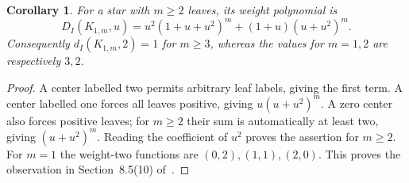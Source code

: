 \documentclass[11pt]{article}
\newtheorem{corollary}[theorem]{Corollary}
\newcommand{\di}{d_I}
\begin{document}
\begin{corollary}\label{cor:star}
For a star with $m\geq2$ leaves, its weight polynomial is
\[
 D_I(K_{1,m},u)=u^2(1+u+u^2)^m+(1+u)(u+u^2)^m.
\]
Consequently $\di(K_{1,m},2)=1$ for $m\geq3$, whereas the values
for $m=1,2$ are respectively $3,2$.
\end{corollary}
\begin{proof}
A center labelled two permits arbitrary leaf labels, giving the first
term. A center labelled one forces all leaves positive, giving
$u(u+u^2)^m$. A zero center also forces positive leaves; for $m\geq2$
their sum is automatically at least two, giving $(u+u^2)^m$.
Reading the coefficient of $u^2$ proves the assertion for $m\geq2$.
For $m=1$ the weight-two functions are $(0,2),(1,1),(2,0)$.
This proves the observation in Section~8.5(10) of~\cite{SZ}.
\end{proof}
\end{document}

